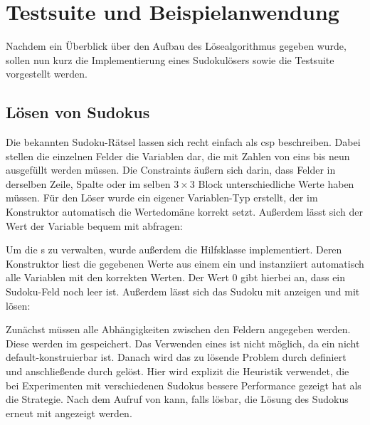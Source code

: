 \section{Testsuite und Beispielanwendung}
Nachdem ein Überblick über den Aufbau des Lösealgorithmus gegeben wurde, sollen nun kurz die Implementierung eines Sudokulösers sowie die Testsuite vorgestellt werden.

\subsection{Lösen von Sudokus}
Die bekannten Sudoku-Rätsel lassen sich recht einfach als \ac*{csp} beschreiben. Dabei stellen die einzelnen Felder die Variablen dar, die mit Zahlen von eins bis neun ausgefüllt
werden müssen. Die Constraints äußern sich darin, dass Felder in derselben Zeile, Spalte oder im selben $3 \times 3$ Block unterschiedliche Werte haben müssen. Für den Löser wurde
ein eigener Variablen-Typ erstellt, der im Konstruktor automatisch die Wertedomäne korrekt setzt. Außerdem lässt sich der Wert der Variable bequem mit  abfragen:

Um die s zu verwalten, wurde außerdem die Hilfsklasse  implementiert. Deren Konstruktor liest die gegebenen Werte aus einem 
ein und instanziiert automatisch alle Variablen mit den korrekten Werten. Der Wert 0 gibt hierbei an, dass ein Sudoku-Feld noch leer ist. Außerdem lässt sich das Sudoku mit
 anzeigen und mit  lösen:

Zunächst müssen alle Abhängigkeiten zwischen den Feldern angegeben werden. Diese werden im  gespeichert. Das Verwenden eines  ist
nicht möglich, da ein  nicht default-konstruierbar ist. Danach wird das zu lösende Problem durch  definiert und anschließende durch
 gelöst. Hier wird explizit die Heuristik  verwendet, die bei Experimenten mit verschiedenen Sudokus bessere Performance gezeigt
hat als die  Strategie. Nach dem Aufruf von  kann, falls lösbar, die Lösung des Sudokus erneut mit  angezeigt werden.

